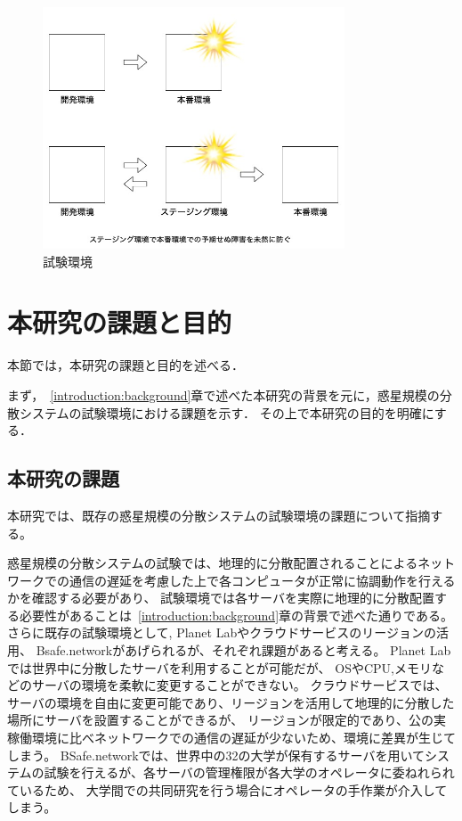 \begin{figure}[htbp]
  \begin{center}
    \includegraphics[width=0.8\textwidth]{./figures/staging.jpg}
    \caption{試験環境}
  \end{center}
\end{figure}

\section{本研究の課題と目的}
\label{introduction:issue-aim}

本節では，本研究の課題と目的を述べる．

まず，~\ref{introduction:background}章で述べた本研究の背景を元に，惑星規模の分散システムの試験環境における課題を示す．
その上で本研究の目的を明確にする．

\subsection{本研究の課題}
\label{introduction:issue-aim:issue}

本研究では、既存の惑星規模の分散システムの試験環境の課題について指摘する。

惑星規模の分散システムの試験では、地理的に分散配置されることによるネットワークでの通信の遅延を考慮した上で各コンピュータが正常に協調動作を行えるかを確認する必要があり、
試験環境では各サーバを実際に地理的に分散配置する必要性があることは~\ref{introduction:background}章の背景で述べた通りである。
さらに既存の試験環境として, Planet Labやクラウドサービスのリージョンの活用、 Bsafe.networkがあげられるが、それぞれ課題があると考える。
Planet Labでは世界中に分散したサーバを利用することが可能だが、 OSやCPU,メモリなどのサーバの環境を柔軟に変更することができない。
クラウドサービスでは、サーバの環境を自由に変更可能であり、リージョンを活用して地理的に分散した場所にサーバを設置することができるが、
リージョンが限定的であり、公の実稼働環境に比べネットワークでの通信の遅延が少ないため、環境に差異が生じてしまう。
BSafe.networkでは、世界中の32の大学が保有するサーバを用いてシステムの試験を行えるが、各サーバの管理権限が各大学のオペレータに委ねれられているため、
大学間での共同研究を行う場合にオペレータの手作業が介入してしまう。

